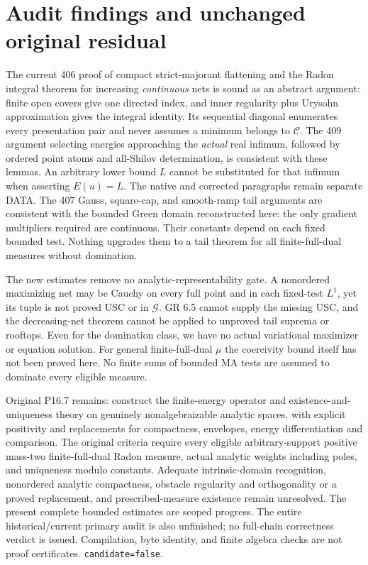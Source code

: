\documentclass[11pt]{article}
\newcommand{\C}{\mathcal C}
\newcommand{\G}{\mathcal G}
\theoremstyle{remark}\newtheorem{remark}[theorem]{Remark}
\begin{document}
\section{Audit findings and unchanged original residual}
The current 406 proof of compact strict-majorant flattening and the
Radon integral theorem for increasing \emph{continuous} nets is sound
as an abstract argument: finite open covers give one directed index,
and inner regularity plus Urysohn approximation gives the integral
identity. Its sequential diagonal enumerates every presentation pair
and never assumes a minimum belongs to $\C$.
The 409 argument selecting energies approaching the \emph{actual}
real infimum, followed by ordered point atoms and all-Shilov
determination, is consistent with these lemmas. An arbitrary lower
bound $L$ cannot be substituted for that infimum when asserting
$E(u)=L$. The native and corrected paragraphs remain separate DATA.
The 407 Gauss, square-cap, and smooth-ramp tail arguments are
consistent with the bounded Green domain reconstructed here: the
only gradient multipliers required are continuous. Their constants
depend on each fixed bounded test. Nothing upgrades them to a
tail theorem for all finite-full-dual measures without domination.

The new estimates remove no analytic-representability gate. A
nonordered maximizing net may be Cauchy on every full point and in
each fixed-test $L^1$, yet its tuple is not proved USC or in $\G$.
GR 6.5 cannot supply the missing USC, and the decreasing-net theorem
cannot be applied to unproved tail suprema or rooftops. Even for the
domination class, we have no actual variational maximizer or equation
solution. For general finite-full-dual $\mu$ the coercivity bound itself
has not been proved here. No finite sums of bounded MA tests are
assumed to dominate every eligible measure.

Original P16.7 remains: construct the finite-energy operator and
existence-and-uniqueness theory on genuinely nonalgebraizable analytic
spaces, with explicit positivity and replacements for compactness,
envelopes, energy differentiation and comparison. The original
criteria require every eligible arbitrary-support positive mass-two
finite-full-dual Radon measure, actual analytic weights including poles,
and uniqueness modulo constants. Adequate intrinsic-domain recognition,
nonordered analytic compactness, obstacle regularity and orthogonality
or a proved replacement, and prescribed-measure existence remain
unresolved. The present complete bounded estimates are scoped progress.
The entire historical/current primary audit is also unfinished; no
full-chain correctness verdict is issued. Compilation, byte identity,
and finite algebra checks are not proof certificates.
\texttt{candidate=false}.
\end{document}
